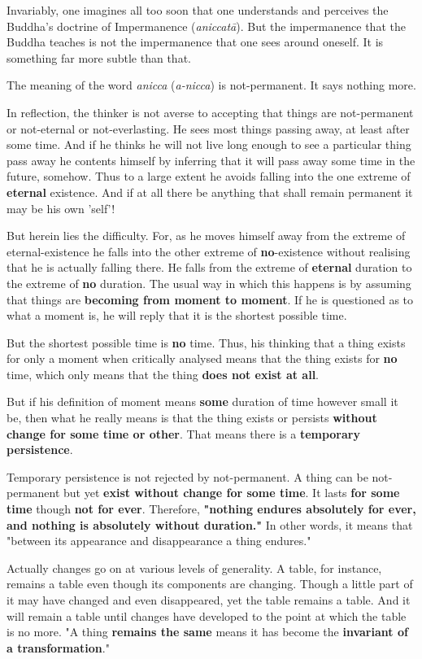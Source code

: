 Invariably, one imagines all too soon that one understands and perceives the Buddha's doctrine of Impermanence (\emph{aniccatā}). But the impermanence that the Buddha teaches is not the impermanence that one sees around oneself. It is something far more subtle than that.

The meaning of the word \emph{anicca} (\emph{a-nicca}) is not-permanent. It says nothing more.

In reflection, the thinker is not averse to accepting that things are not-permanent or not-eternal or not-everlasting. He sees most things passing away, at least after some time. And if he thinks he will not live long enough to see a particular thing pass away he contents himself by inferring that it will pass away some time in the future, somehow. Thus to a large extent he avoids falling into the one extreme of \textbf{eternal} existence. And if at all there be anything that shall remain permanent it may be his own 'self'!

But herein lies the difficulty. For, as he moves himself away from the extreme of eternal-existence he falls into the other extreme of \textbf{no}-existence without realising that he is actually falling there. He falls from the extreme of \textbf{eternal} duration to the extreme of \textbf{no} duration. The usual way in which this happens is by assuming that things are \textbf{becoming from moment to moment}. If he is questioned as to what a moment is, he will reply that it is the shortest possible time.

But the shortest possible time is \textbf{no} time. Thus, his thinking that a thing exists for only a moment when critically analysed means that the thing exists for \textbf{no} time, which only means that the thing \textbf{does not exist at all}.

But if his definition of moment means \textbf{some} duration of time however small it be, then what he really means is that the thing exists or persists \textbf{without change for some time or other}. That means there is a \textbf{temporary persistence}.

Temporary persistence is not rejected by not-permanent. A thing can be not-permanent but yet \textbf{exist without change for some time}. It lasts \textbf{for some time} though \textbf{not for ever}. Therefore, \textbf{"nothing endures absolutely for ever, and nothing is absolutely without duration."} In other words, it means that "between its appearance and disappearance a thing endures."

Actually changes go on at various levels of generality. A table, for instance, remains a table even though its components are changing. Though a little part of it may have changed and even disappeared, yet the table remains a table. And it will remain a table until changes have developed to the point at which the table is no more. "A thing \textbf{remains the same} means it has become the \textbf{invariant of a transformation}."

